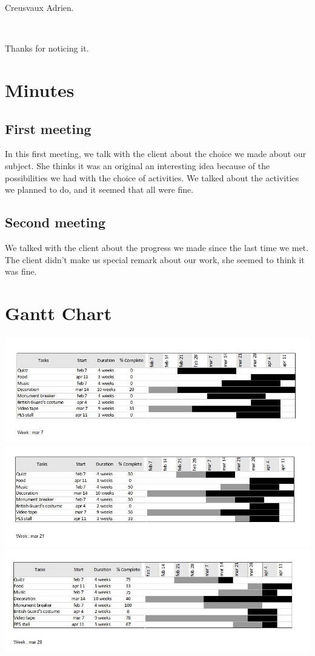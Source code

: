 \documentclass[11pt;a4paper]{report}
\begin{document}
Creusvaux Adrien.

~

Thanks for noticing it.
  \section{Minutes}
   \subsection{First meeting}
In this first meeting, we talk with the client about the choice we made about our subject. She thinks it was an original an interesting idea because of the possibilities we had with the choice of activities.
We talked about the activities we planned to do, and it seemed that all were fine.

   \subsection{Second meeting}
We talked with the client about the progress we made since the last time we met. The client didn't make us special remark about our work, she seemed to think it was fine.

  \section{Gantt Chart}
    \begin{center}
     \includegraphics[width=15cm]{images/gc1}
     \includegraphics[width=15cm]{images/gc2}
     \includegraphics[width=15cm]{images/gc3}
    \end{center}
\end{document}
